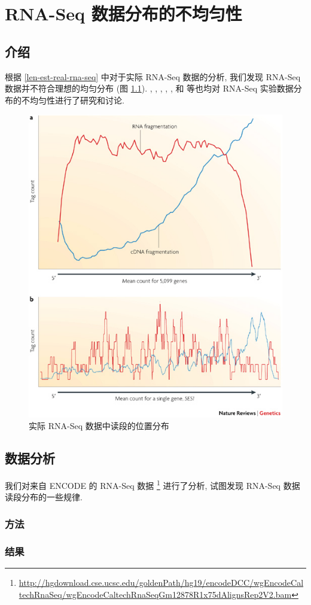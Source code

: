 \chapter{RNA-Seq 数据分布的不均匀性}
\label{chap-rna-seq-nonunif}

\section{介绍}
根据 \ref{len-est-real-rna-seq} 中对于实际 RNA-Seq 数据的分析, 
我们发现 RNA-Seq 数据并不符合理想的均匀分布 (图 \ref{rna-seq-bias}). 
, , 
, , , 和
 等也均对 RNA-Seq 实验数据分布的不均匀性进行了研究和讨论. 

\begin{figure}[!t]
\centering
\includegraphics[width=\textwidth]{figures/nonunif/rna-seq-bias.jpg}
\caption{实际 RNA-Seq 数据中读段的位置分布 \cite{wang2009rna}}
\label{rna-seq-bias}
\end{figure}

\section{数据分析}
我们对来自 ENCODE \cite{encode} 的 RNA-Seq 数据 
\footnote{\url{http://hgdownload.cse.ucsc.edu/goldenPath/hg19/encodeDCC/wgEncodeCaltechRnaSeq/wgEncodeCaltechRnaSeqGm12878R1x75dAlignsRep2V2.bam}} 
进行了分析, 试图发现 RNA-Seq 数据读段分布的一些规律. 

\subsection{方法}

\subsection{结果}


